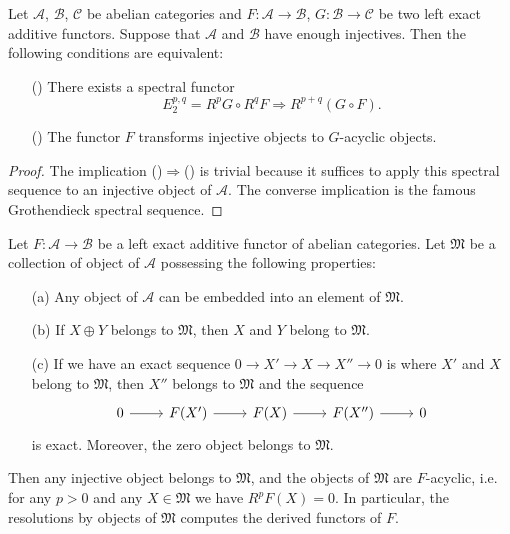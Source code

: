 \begin{proposition}\label{abelian category G spectral sequence iff injective to acyclic}
Let $\mathcal{A}$, $\mathcal{B}$, $\mathcal{C}$ be abelian categories and $F:\mathcal{A}\to \mathcal{B}$, $G:\mathcal{B}\to \mathcal{C}$ be two left exact additive functors. Suppose that $\mathcal{A}$ and $\mathcal{B}$ have enough injectives. Then the following conditions are equivalent:
\begin{enumerate}
    \item[(\rmnum{1})] There exists a spectral functor
    \[E_2^{p,q}=R^pG\circ R^qF\Rightarrow R^{p+q}(G\circ F).\]
    \item[(\rmnum{2})] The functor $F$ transforms injective objects to $G$-acyclic objects. 
\end{enumerate}
\end{proposition}
\begin{proof}
The implication ()$\Rightarrow$() is trivial because it suffices to apply this spectral sequence to an injective object of $\mathcal{A}$. The converse implication is the famous Grothendieck spectral sequence.
\end{proof}

\begin{proposition}\label{abelian category acyclic collection if}
Let $F:\mathcal{A}\to \mathcal{B}$ be a left exact additive functor of abelian categories. Let $\mathfrak{M}$ be a collection of object of $\mathcal{A}$ possessing the following properties:
\begin{enumerate}
    \item[(a)] Any object of $\mathcal{A}$ can be embedded into an element of $\mathfrak{M}$.
    \item[(b)] If $X\oplus Y$ belongs to $\mathfrak{M}$, then $X$ and $Y$ belong to $\mathfrak{M}$.
    \item[(c)] If we have an exact sequence $0\to X'\to X\to X''\to 0$ is where $X'$ and $X$ belong to $\mathfrak{M}$, then $X''$ belongs to $\mathfrak{M}$ and the sequence
    \[\begin{tikzcd}
        0\ar[r]&F(X')\ar[r]&F(X)\ar[r]&F(X'')\ar[r]&0
    \end{tikzcd}\]
    is exact. Moreover, the zero object belongs to $\mathfrak{M}$.
\end{enumerate}
Then any injective object belongs to $\mathfrak{M}$, and the objects of $\mathfrak{M}$ are $F$-acyclic, i.e. for any $p>0$ and any $X\in\mathfrak{M}$ we have $R^pF(X)=0$. In particular, the resolutions by objects of $\mathfrak{M}$ computes the derived functors of $F$.
\end{proposition}

